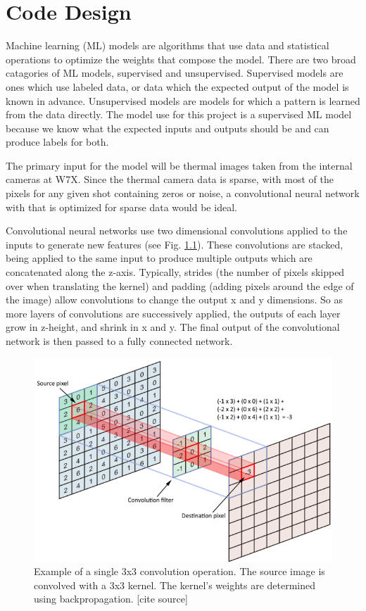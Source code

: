 %
\chapter{Code Design}
\label{sec:code:model}

Machine learning (ML) models are algorithms that use data and statistical operations to optimize the weights that compose the model.
There are two broad catagories of ML models, supervised and unsupervised.
Supervised models are ones which use labeled data, or data which the expected output of the model is known in advance.
Unsupervised models are models for which a pattern is learned from the data directly.
The model use for this project is a supervised ML model because we know what the expected inputs and outputs should be and can produce labels for both.

The primary input for the model will be thermal images taken from the internal cameras at W7X.
Since the thermal camera data is sparse, with most of the pixels for any given shot containing zeros or noise, a convolutional neural network with that is optimized for sparse data would be ideal.



Convolutional neural networks use two dimensional convolutions applied to the inputs to generate new features (see Fig. \ref{fig:code:2DConv}).
These convolutions are stacked, being applied to the same input to produce multiple outputs which are concatenated along the z-axis.
Typically, strides (the number of pixels skipped over when translating the kernel) and padding (adding pixels around the edge of the image) allow convolutions to change the output x and y dimensions.
So as more layers of convolutions are successively applied, the outputs of each layer grow in z-height, and shrink in x and y.
The final output of the convolutional network is then passed to a fully connected network.


\begin{figure}[htb]
    \includegraphics[width=\textwidth]{images/2d-Conv.png}
    \caption{Example of a single 3x3 convolution operation. The source image is convolved with a 3x3 kernel. The kernel's weights are determined using backpropagation. [cite source]}
    \label{fig:code:2DConv}
\end{figure}


